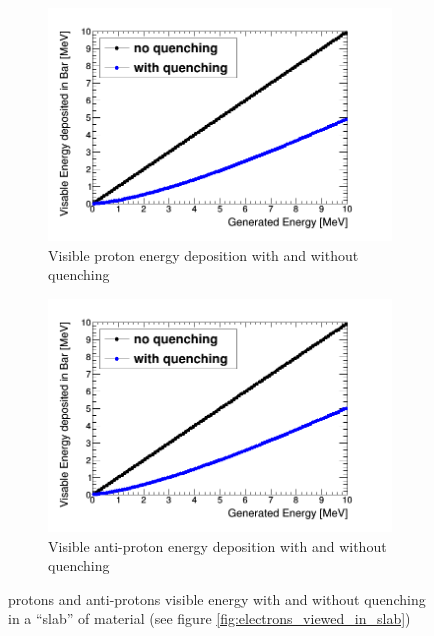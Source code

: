 \begin{figure}[!h]
\centering
\begin{subfigure}{.5\textwidth}
  \centering
  \includegraphics[width=\linewidth]{quench_eng_protons.png}
  \captionsetup{width=.9\linewidth}
  \caption{Visible proton energy deposition with and without quenching}
  \label{subFig:proton_quenched_and_not}
\end{subfigure}%
\begin{subfigure}{.5\textwidth}
  \centering
  \includegraphics[width=\linewidth]{quench_eng_Aprotons.png}
  \captionsetup{width=.9\linewidth}
  \caption{Visible anti-proton energy deposition with and without quenching}
  \label{subFig:Aproton_quenched_and_not}
\end{subfigure}
\caption{protons and anti-protons visible energy with and without quenching in a ``slab'' of material (see figure \ref{fig:electrons_viewed_in_slab})}
\label{fig:proton_Apronton_quenched_and_not}
\end{figure}

